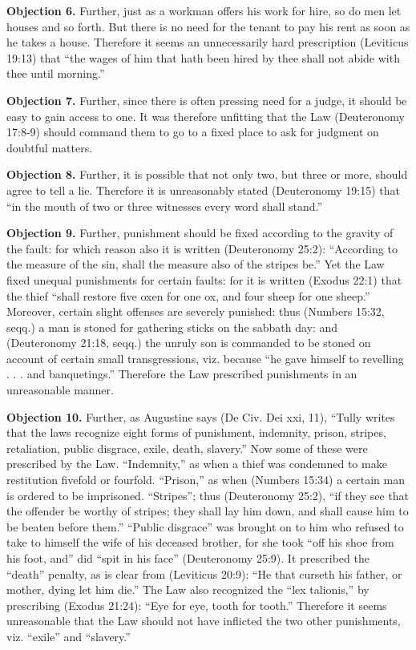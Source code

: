 \textbf{Objection 6.} Further, just as a workman offers his work for hire, so do men let houses and so forth. But there is no need for the tenant to pay his rent as soon as he takes a house. Therefore it seems an unnecessarily hard prescription (Leviticus 19:13) that ``the wages of him that hath been hired by thee shall not abide with thee until morning.''

\textbf{Objection 7.} Further, since there is often pressing need for a judge, it should be easy to gain access to one. It was therefore unfitting that the Law (Deuteronomy 17:8-9) should command them to go to a fixed place to ask for judgment on doubtful matters.

\textbf{Objection 8.} Further, it is possible that not only two, but three or more, should agree to tell a lie. Therefore it is unreasonably stated (Deuteronomy 19:15) that ``in the mouth of two or three witnesses every word shall stand.''

\textbf{Objection 9.} Further, punishment should be fixed according to the gravity of the fault: for which reason also it is written (Deuteronomy 25:2): ``According to the measure of the sin, shall the measure also of the stripes be.'' Yet the Law fixed unequal punishments for certain faults: for it is written (Exodus 22:1) that the thief ``shall restore five oxen for one ox, and four sheep for one sheep.'' Moreover, certain slight offenses are severely punished: thus (Numbers 15:32, seqq.) a man is stoned for gathering sticks on the sabbath day: and (Deuteronomy 21:18, seqq.) the unruly son is commanded to be stoned on account of certain small transgressions, viz. because ``he gave himself to revelling . . . and banquetings.'' Therefore the Law prescribed punishments in an unreasonable manner.

\textbf{Objection 10.} Further, as Augustine says (De Civ. Dei xxi, 11), ``Tully writes that the laws recognize eight forms of punishment, indemnity, prison, stripes, retaliation, public disgrace, exile, death, slavery.'' Now some of these were prescribed by the Law. ``Indemnity,'' as when a thief was condemned to make restitution fivefold or fourfold. ``Prison,'' as when (Numbers 15:34) a certain man is ordered to be imprisoned. ``Stripes''; thus (Deuteronomy 25:2), ``if they see that the offender be worthy of stripes; they shall lay him down, and shall cause him to be beaten before them.'' ``Public disgrace'' was brought on to him who refused to take to himself the wife of his deceased brother, for she took ``off his shoe from his foot, and'' did ``spit in his face'' (Deuteronomy 25:9). It prescribed the ``death'' penalty, as is clear from (Leviticus 20:9): ``He that curseth his father, or mother, dying let him die.'' The Law also recognized the ``lex talionis,'' by prescribing (Exodus 21:24): ``Eye for eye, tooth for tooth.'' Therefore it seems unreasonable that the Law should not have inflicted the two other punishments, viz. ``exile'' and ``slavery.''

